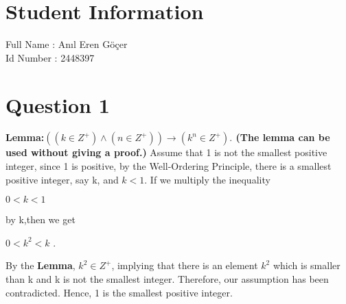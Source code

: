 \documentclass[11pt]{article}
\begin{document}
\section*{Student Information } 
Full Name : Anıl Eren Göçer \\
Id Number : 2448397 \\


\section*{Question 1}
\textbf{Lemma:\space$((k \in Z^{+})\wedge (n \in Z^+)) \rightarrow (k^n \in Z^{+}).$ (The lemma can be used without giving a proof.)}
\newline \newline
\indent Assume that 1 is not the smallest positive integer, since 1 is positive, by the Well-Ordering Principle, there is a smallest positive integer, say k, and $k<1$. If we multiply the inequality \newline

\begin{center}
    $0 < k < 1$
\end{center}  \newline \newline
by k,then we get
\begin{center}
    $0 < k^2 < k$ \space \space .
\end{center} \newline \newline

By the \textbf{Lemma}, $k^2 \in Z^{+}$, implying that there is an element $k^2$ which is smaller than k and k is not the smallest integer. Therefore, our assumption has been contradicted. \newline  \newline 
\indent Hence, 1 is the smallest positive integer. 
\newpage
\end{document}
